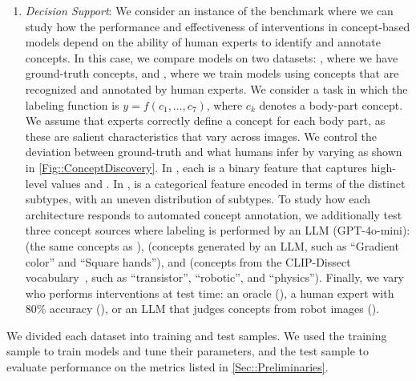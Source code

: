 \documentclass[11pt]{article}
\begin{document}
\begin{enumerate}
    \item \emph{Decision Support}: We consider an instance of the  benchmark where we can study how the performance and effectiveness of interventions in concept-based models depend on the ability of human experts to identify and annotate concepts. In this case, we compare models on two datasets: , where we have ground-truth concepts, and , where we train models using concepts that are recognized and annotated by human experts. We consider a task in which the labeling function is $y = f(c_1,\dots,c_7)$, where $c_k$ denotes a body-part concept. We assume that experts correctly define a concept for each body part, as these are salient characteristics that vary across images. We control the deviation between ground-truth and what humans infer by varying  as shown in \cref{Fig::ConceptDiscovery}. In , each  is a binary feature that captures high-level values  and . In ,  is a categorical feature encoded in terms of the distinct subtypes, with an uneven distribution of subtypes. To study how each architecture responds to automated concept annotation, we additionally test three concept sources where labeling is performed by an LLM (GPT-4o-mini):   (the same concepts as ),  (concepts generated by an LLM, such as ``Gradient color'' and ``Square hands''), and  (concepts from the CLIP-Dissect vocabulary~\citep{oikarinen2022clip}, such as ``transistor'', ``robotic'', and ``physics''). Finally, we vary who performs interventions at test time: an oracle (), a human expert with 80\% accuracy (), or an LLM that judges concepts from robot images ().

\end{enumerate}

We divided each dataset into training and test samples. We used the training sample to train models and tune their parameters, and the test sample to evaluate performance on the metrics listed in \cref{Sec::Preliminaries}. 
\end{document}
